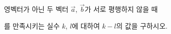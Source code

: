 영벡터가 아닌 두 벡터 $\vec{a}$, $\vec{b}$가 서로 평행하지 않을 때 \par\smallskip{}\par\smallskip\noindent 를 만족시키는 실수 $k$, $l$에 대하여 $k-l$의 값을 구하시오.

